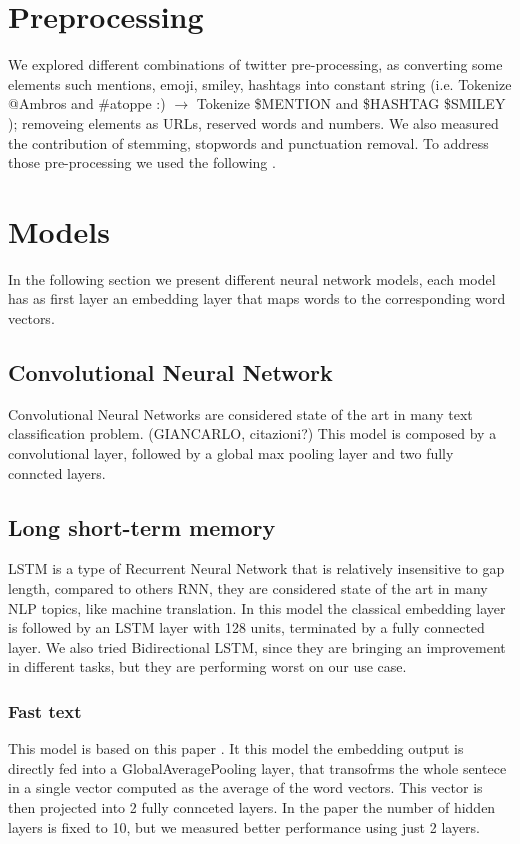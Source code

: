 \section{Preprocessing}
We explored different combinations of twitter pre-processing, as converting some elements such mentions, emoji, smiley, hashtags into constant string (i.e. Tokenize @Ambros and \#atoppe :) $\rightarrow $ Tokenize \$MENTION and \$HASHTAG \$SMILEY ); removeing elements as URLs, reserved words and numbers.
We also measured the contribution of stemming, stopwords and punctuation removal.
To address those pre-processing we used the following \cite{nltk} \cite{tweets-preprocessor}.


\section{Models}
In the following section we present different neural network models, each model has as first layer an embedding layer that maps words to the corresponding word vectors.


\subsection{Convolutional Neural Network}
Convolutional Neural Networks are considered state of the art in many text classification problem. (GIANCARLO, citazioni?)
This model is composed by a convolutional layer, followed by a global max pooling layer and two fully conncted layers.

\subsection{Long short-term memory}
LSTM is a type of Recurrent Neural Network that is relatively insensitive to gap length, compared to others RNN, they are considered state of the art in many NLP topics, like machine translation.
In this model the classical embedding layer is followed by an LSTM layer with 128 units, terminated by a fully connected layer.
We also tried Bidirectional LSTM, since they are bringing an improvement in different tasks, but they are performing worst on our use case.

\subsubsection{Fast text}
This model is based on this paper \cite{joulin2016bag}. It this model the embedding output is directly fed into a GlobalAveragePooling layer, that transofrms the whole sentece in a single vector computed as the average of the word vectors.
This vector is then projected into 2 fully connceted layers. In the paper the number of hidden layers is fixed to 10, but we measured better performance using just 2 layers.


